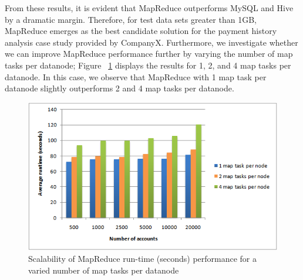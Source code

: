 % 

From these results, it is evident that MapReduce outperforms MySQL and Hive by a dramatic margin. Therefore, for test data sets greater than 1GB, MapReduce emerges as the best candidate solution for the payment history analysis case study provided by CompanyX. Furthermore, we investigate whether we can improve MapReduce performance further by varying the number of map tasks per datanode; Figure ~\ref{fig:maptasks} displays the results for 1, 2, and 4 map tasks per datanode. In this case, we observe that MapReduce with 1 map task per datanode slightly outperforms 2 and 4 map tasks per datanode.

\begin{figure}[h!]
 \centering
 \includegraphics[width=\textwidth]{../images/runtime_vs_mapTasks.png}
 \caption{Scalability of MapReduce run-time (seconds) performance for a varied number of map tasks per datanode}
 \label{fig:maptasks}
\end{figure}